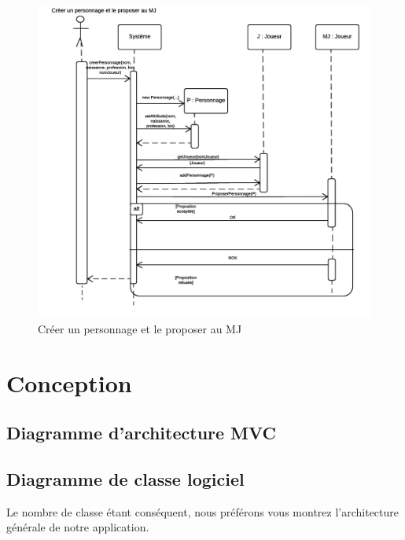 \documentclass[a4paper,oneside,10pt]{article}
\begin{document}
\begin{figure}[H]
	\begin{center}
		\includegraphics[width=12cm]{images/sequence/DS-CreerPerso.png}  
		\caption{Créer un personnage et le proposer au MJ}
	\end{center}
\end{figure}


\pagebreak

\section{Conception}


\subsection{Diagramme d'architecture MVC}


\subsection{Diagramme de classe logiciel}

Le nombre de classe étant conséquent, nous préférons vous montrez l'architecture générale de notre application. 
\end{document}
